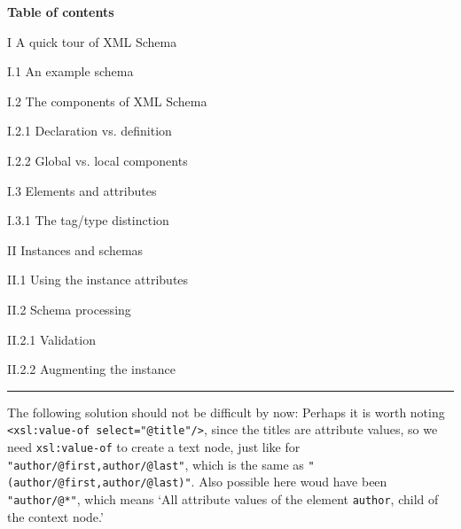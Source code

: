 \noindent\textbf{Table of contents}
\begin{itemize*}
  \item [I] A quick tour of XML Schema
    \begin{itemize*}
      \item [I.1] An example schema
      \item [I.2] The components of XML Schema
        \begin{itemize*}
          \item [I.2.1] Declaration vs. definition
          \item [I.2.2] Global vs. local components
        \end{itemize*}
      \item [I.3] Elements and attributes
        \begin{itemize*}
          \item [I.3.1] The tag/type distinction
        \end{itemize*}
    \end{itemize*}
  \item [II] Instances and schemas
    \begin{itemize*}
      \item [II.1] Using the instance attributes
      \item [II.2] Schema processing
        \begin{itemize*}
          \item [II.2.1] Validation
          \item [II.2.2] Augmenting the instance
        \end{itemize*}
    \end{itemize*}
\end{itemize*}
\noindent\rule{\linewidth}{0.5pt}

\bigskip

\noindent The following solution should not be difficult by now:
\noindent Perhaps it is worth noting \texttt{<xsl:value-of
  select="@title"/>}, since the titles are attribute values, so we
need \texttt{xsl:value-of} to create a text node, just like for
\texttt{"author/@first,author/@last"}, which is the same as
\texttt{"(author/@first,author/@last)"}. Also possible here woud have
been \texttt{"author/@*"}, which means `All attribute values of the
element \texttt{author}, child of the context node.'

